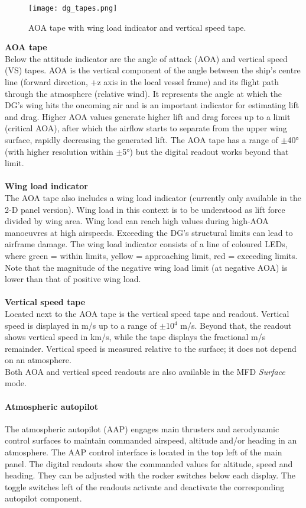 \documentclass[Orbiter User Manual.tex]{subfiles}
\begin{document}
\begin{figure}[H]
  \centering
  \texttt{[image: dg\_tapes.png]}
  \caption{AOA tape with wing load indicator and vertical speed tape.}
\end{figure}

\noindent
\textbf{AOA tape}\\
Below the attitude indicator are the angle of attack (AOA) and vertical speed (VS) tapes. AOA is the vertical component of the angle between the ship's centre line (forward direction, +z axis in the local vessel frame) and its flight path through the atmosphere (relative wind). It represents the angle at which the DG's wing hits the oncoming air and is an important indicator for estimating lift and drag. Higher AOA values generate higher lift and drag forces up to a limit (critical AOA), after which the airflow starts to separate from the upper wing surface, rapidly decreasing the generated lift. The AOA tape has a range of $\pm$40° (with higher resolution within $\pm$5°) but the digital readout works beyond that limit.\\
\\
\textbf{Wing load indicator}\\
The AOA tape also includes a wing load indicator (currently only available in the 2-D panel version). Wing load in this context is to be understood as lift force divided by wing area. Wing load can reach high values during high-AOA manoeuvres at high airspeeds. Exceeding the DG's structural limits can lead to airframe damage. The wing load indicator consists of a line of coloured LEDs, where green = within limits, yellow = approaching limit, red = exceeding limits. Note that the magnitude of the negative wing load limit (at negative AOA) is lower than that of positive wing load.\\
\\
\textbf{Vertical speed tape}\\
Located next to the AOA tape is the vertical speed tape and readout. Vertical speed is displayed in m/s up to a range of $\pm$10$^{4}$ m/s. Beyond that, the readout shows vertical speed in km/s, while the tape displays the fractional m/s remainder. Vertical speed is measured relative to the surface; it does not depend on an atmosphere.\\
Both AOA and vertical speed readouts are also available in the MFD \textit{Surface} mode.


\paragraph{Atmospheric autopilot}
\label{para:dg_aap}
The atmospheric autopilot (AAP) engages main thrusters and aerodynamic control surfaces to maintain commanded airspeed, altitude and/or heading in an atmosphere. The AAP control interface is located in the top left of the main panel. The digital readouts show the commanded values for altitude, speed and heading. They can be adjusted with the rocker switches below each display. The toggle switches left of the readouts activate and deactivate the corresponding autopilot component.
\end{document}
